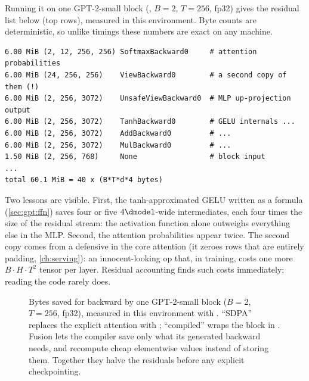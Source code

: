 Running it on one GPT-2-small block (, $B=2$, $T=256$, fp32) gives the
residual list below (top rows), measured in this environment. Byte counts are deterministic, so
unlike timings these numbers are exact on any machine.

\begin{lstlisting}[style=plain]
6.00 MiB (2, 12, 256, 256) SoftmaxBackward0     # attention probabilities
6.00 MiB (24, 256, 256)    ViewBackward0        # a second copy of them (!)
6.00 MiB (2, 256, 3072)    UnsafeViewBackward0  # MLP up-projection output
6.00 MiB (2, 256, 3072)    TanhBackward0        # GELU internals ...
6.00 MiB (2, 256, 3072)    AddBackward0         # ...
6.00 MiB (2, 256, 3072)    MulBackward0         # ...
1.50 MiB (2, 256, 768)     None                 # block input
...
total 60.1 MiB = 40 x (B*T*d*4 bytes)
\end{lstlisting}

Two lessons are visible. First, the tanh-approximated GELU written as a formula
(\cref{sec:gpt:ffn}) saves four or five $4\dmodel$-wide intermediates, each four times the size of the
residual stream: the activation function alone outweighs everything else in the MLP. Second, the
attention probabilities appear twice. The second copy comes from a defensive
 in the core attention (it zeroes rows that are entirely padding,
\cref{ch:serving}): an innocent-looking op that, in training, costs one more $B\cdot H\cdot T^2$
tensor per layer. Residual accounting finds such costs immediately; reading the code rarely does.

\begin{figure}[t]
\centering
{}
\caption{Bytes saved for backward by one GPT-2-small block ($B=2$, $T=256$, fp32), measured in
this environment with . ``SDPA'' replaces the explicit attention with
; ``compiled'' wraps the block in .
Fusion lets the compiler save only what its generated backward needs, and recompute cheap
elementwise values instead of storing them. Together they halve the residuals before any
explicit checkpointing.}
\label{fig:perf:residuals}
\end{figure}


